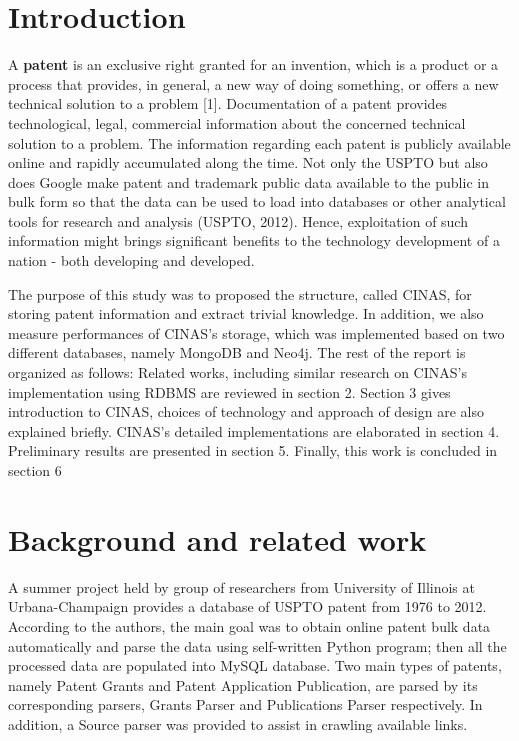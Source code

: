 \documentclass{sig-alternate}
\begin{document}
{\section{Introduction}
A \textbf{patent} is an exclusive right granted for an invention, which is a product or a process that provides, in general, a new way of doing something, or offers a new technical solution to a 
problem [1]. Documentation of a patent provides technological, legal, commercial information about the concerned technical solution to a problem. The information regarding each patent is publicly available online and rapidly accumulated along the time. Not only the USPTO but also does Google make patent and trademark public data available to the public in bulk form so that the data can be used to load into databases or other analytical tools for research and analysis (USPTO, 2012). Hence, exploitation of such information might brings significant benefits to the technology development of a nation - both developing and developed.

The purpose of this study was to proposed the structure, called CINAS, for storing patent information and extract trivial knowledge. In addition, we also measure performances of CINAS's storage, which was implemented based on two different databases, namely MongoDB and Neo4j. The rest of the report is organized as follows: Related works, including similar research on CINAS's implementation using RDBMS are reviewed in section 2. Section 3 gives introduction to CINAS, choices of technology and approach of design are also explained briefly. CINAS's detailed implementations are elaborated in section 4. Preliminary results are presented in section 5. Finally, this work is concluded in section 6

\section{Background and related work}
A summer project held by group of researchers from University of Illinois at Urbana-Champaign provides a database of USPTO patent from 1976 to 2012. According to the authors,  the main goal was to obtain online patent bulk data automatically and parse the data using self-written Python program; then all the processed data are populated into MySQL database. Two main types of patents, namely Patent Grants and Patent Application Publication, are parsed by its corresponding parsers, Grants Parser and Publications Parser respectively. In addition, a Source parser was provided to assist in crawling available links.

}
\end{document}

